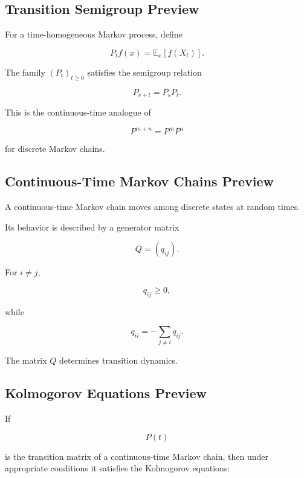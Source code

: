 \subsection{Transition Semigroup Preview}
\label{subsec:transition-semigroup-preview}

For a time-homogeneous Markov process, define

\[
\boxed{
P_t f(x)
=
\mathbb{E}_x[f(X_t)].
}
\]

The family \((P_t)_{t\geq0}\) satisfies the semigroup relation

\[
\boxed{
P_{s+t}
=
P_sP_t.
}
\]

This is the continuous-time analogue of

\[
P^{m+n}=P^mP^n
\]

for discrete Markov chains.

\subsection{Continuous-Time Markov Chains Preview}
\label{subsec:ctmc-preview}

A continuous-time Markov chain moves among discrete states at random
times.

Its behavior is described by a generator matrix

\[
\boxed{
Q=(q_{ij}).
}
\]

For \(i\neq j\),

\[
q_{ij}\geq0,
\]

while

\[
\boxed{
q_{ii}
=
-
\sum_{j\neq i}q_{ij}.
}
\]

The matrix \(Q\) determines transition dynamics.

\subsection{Kolmogorov Equations Preview}
\label{subsec:kolmogorov-equations-preview}

If

\[
P(t)
\]

is the transition matrix of a continuous-time Markov chain, then under
appropriate conditions it satisfies the Kolmogorov equations:

